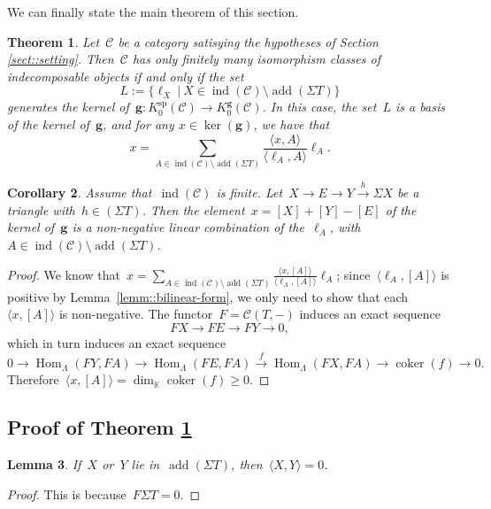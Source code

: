 \documentclass{amsart}
\newtheorem{theorem}{Theorem}[section]
\newtheorem{corollary}[theorem]{Corollary}
\newtheorem{lemma}[theorem]{Lemma}
\theoremstyle{definition}
\renewcommand{\b}[1]{{\boldsymbol{#1}}} %
\newcommand{\pg}[1]{\todo[color=green!30]{#1 \\ \hfill --- PG.}}
\newcommand{\field}{\mathbb{K}}
\newcommand{\cat}{\mathcal{C}}
\newcommand{\Hom}[1]{\operatorname{Hom}_{#1}}
\newcommand{\susp}{\Sigma}
\newcommand{\add}{\operatorname{add}}
\newcommand{\spl}{\operatorname{sp}}
\newcommand{\Ksp}{K_0^{\spl}}
\newcommand{\Kg}{K_0^{\b{g}}}
\newcommand{\ind}{\operatorname{ind}}
\newcommand{\coker}{\operatorname{coker}}
\begin{document}
We can finally state the main theorem of this section. \pg{recall Auslander}

\begin{theorem}\label{theo::relations-g-vecteurs}
 Let~$\cat$ be a category satisying the hypotheses of Section \ref{sect::setting}.  Then~$\cat$ has only finitely many isomorphism classes of indecomposable objects if and only if the set~\[L:=\big\{\ell_X \ | \ X\in \ind(\cat)\setminus \add(\susp T) \big\}\] generates the kernel of~$\b g:\Ksp(\cat) \to \Kg(\cat)$. 
 In this case, the set~$L$ is a basis of the kernel of~$\b g$, and for any $x\in \ker(\b g)$, we have that
 \[
  x= \sum_{A\in \ind(\cat) \setminus \add(\susp T)} \frac{\langle x, A \rangle}{\langle \ell_A, A \rangle} \ell_A.
 \]
\end{theorem}

\begin{corollary}
 Assume that~$\ind(\cat)$ is finite.  Let~$X\xrightarrow{} E \xrightarrow{} Y \xrightarrow{h} \susp X$ be a triangle with~$h\in (\susp T)$.  Then the element~$x=[X]+[Y]-[E]$ of the kernel of~$\b g$ is a non-negative linear combination of the~$\ell_A$, with~$A\in \ind(\cat)\setminus \add(\susp T)$.
\end{corollary}
\begin{proof}
 We know that~$x=\sum_{A\in \ind(\cat)\setminus \add(\susp T)} \frac{\langle x, [A] \rangle}{\langle \ell_A, [A] \rangle} \ell_A$; since~$\langle \ell_A, [A] \rangle$ is positive by Lemma~\ref{lemm::bilinear-form}, we only need to show that each~$\langle x, [A] \rangle$ is non-negative. 
 The functor~$F=\cat(T,-)$ induces an exact sequence
 \[
  FX \to FE \to FY \to 0,
 \]
 which in turn induces an exact sequence
 \[
  0\to \Hom{\Lambda}(FY, FA) \to \Hom{\Lambda}(FE, FA) \xrightarrow{f} \Hom{\Lambda}(FX, FA) \to \coker(f) \to 0.
 \]
 Therefore~$\langle x, [A] \rangle = \dim_{\field} \coker(f) \geq 0$.
\end{proof}


\subsection{Proof of Theorem \ref{theo::relations-g-vecteurs}}

\begin{lemma}\label{lemm::bilinear-form-suspention-T}
 If~$X$ or~$Y$ lie in~$\add(\susp T)$, then~$\langle X, Y \rangle = 0$.
\end{lemma}
\begin{proof}
 This is because~$F\susp T = 0$.
\end{proof}
\end{document}
